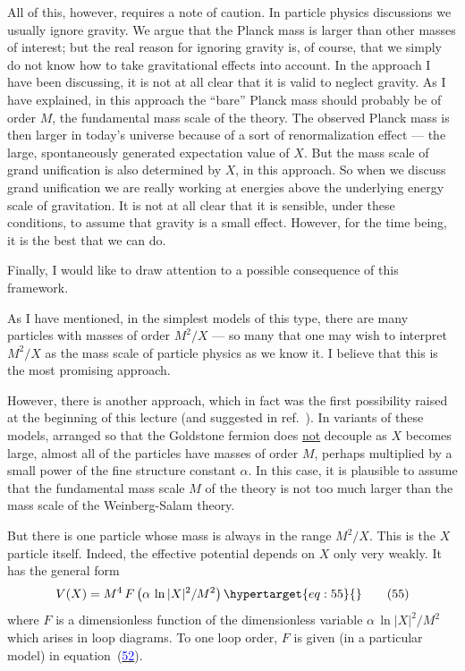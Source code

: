 \documentclass[11pt,a4paper]{article}
\newcommand{\eqtarget}[1]{\hypertarget{eq:#1}{\mathstrut}\tag{#1}}
\newcommand{\eqnref}[1]{(\hyperlink{eq:#1}{\textcolor{blue}{#1}})}
\begin{document}
All of this, however, requires a note of caution. In particle
physics discussions we usually ignore gravity. We argue that the
Planck mass is larger than other masses of interest; but the real
reason for ignoring gravity is, of course, that we simply do not know
how to take gravitational effects into account. In the approach I
have been discussing, it is not at all clear that it is valid to neglect
gravity. As I have explained, in this approach the ``bare''
Planck mass should probably be of order $M$, the fundamental mass scale
of the theory. The observed Planck mass is then larger in today's
universe because of a sort of renormalization effect --- the large,
spontaneously generated expectation value of $X$. But the mass scale
of grand unification is also determined by $X$, in this approach. So
when we discuss grand unification we are really working at energies
above the underlying energy scale of gravitation. It is not at all
clear that it is sensible, under these conditions, to assume that
gravity is a small effect. However, for the time being, it is the
best that we can do.

Finally, I would like to draw attention to a possible consequence
of this framework.

As I have mentioned, in the simplest models of this type, there
are many particles with masses of order $M^2/X$ --- so many that one may
wish to interpret $M^2/X$ as the mass scale of particle physics as we
know it. I believe that this is the most promising approach.

However, there is another approach, which in fact was the first
possibility raised at the beginning of this lecture (and suggested
in ref.~\cite{ref14}). In variants of these models, arranged so that
the Goldstone fermion does \underline{not} decouple as $X$ becomes large, almost
all of the particles have masses of order $M$, perhaps multiplied by a
small power of the fine structure constant $\alpha$. In this case, it is
plausible to assume that the fundamental mass scale $M$ of the theory
is not too much larger than the mass scale of the Weinberg-Salam
theory.

But there is one particle whose mass is always in the range $M^2/X$.
This is the $X$ particle itself. Indeed, the effective potential depends
on $X$ only very weakly. It has the general form
\begin{equation}
V(X) = M^4\, F\left(\alpha\, \ln |X|^2/M^2\right)
\eqtarget{55}
\end{equation}
where $F$ is a dimensionless function of the dimensionless variable
$\alpha\, \ln |X|^2/M^2$ which arises in loop diagrams. To one loop order, $F$ is
given (in a particular model) in equation~\eqnref{52}.
\end{document}
